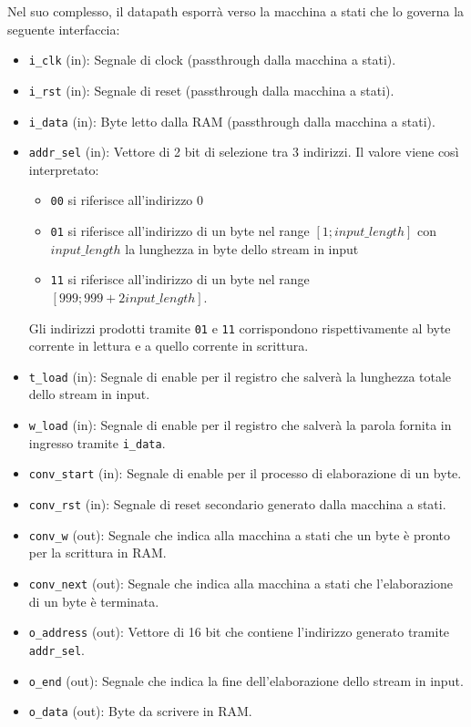 \documentclass[a4paper,11pt]{article}
\begin{document}
Nel suo complesso, il datapath esporrà verso la macchina a stati che lo governa
la seguente interfaccia:

\begin{itemize}
  \item \texttt{i\_clk} (in): Segnale di clock (passthrough dalla macchina a
    stati).
  \item \texttt{i\_rst} (in): Segnale di reset (passthrough dalla macchina a
    stati).
  \item \texttt{i\_data} (in): Byte letto dalla RAM (passthrough dalla macchina a
    stati).
  \item \texttt{addr\_sel} (in): Vettore di 2 bit di selezione tra 3 indirizzi. Il
    valore viene così interpretato:
    \begin{itemize}
      \item \texttt{00} si riferisce all'indirizzo 0
      \item \texttt{01} si riferisce all'indirizzo di un byte nel range $[1;
        \mathit{input\_length}]$ con $\mathit{input\_length}$ la lunghezza in
        byte dello stream in input
      \item \texttt{11} si riferisce all'indirizzo di un byte nel range $[999;
        999 + 2\mathit{input\_length}]$.
    \end{itemize}

    Gli indirizzi prodotti tramite \texttt{01} e \texttt{11} corrispondono
    rispettivamente al byte corrente in lettura e a quello corrente in
    scrittura.
  \item \texttt{t\_load} (in): Segnale di enable per il registro che salverà la
    lunghezza totale dello stream in input.
  \item \texttt{w\_load} (in): Segnale di enable per il registro che salverà la
    parola fornita in ingresso tramite \texttt{i\_data}.
  \item \texttt{conv\_start} (in): Segnale di enable per il processo di
    elaborazione di un byte.
  \item \texttt{conv\_rst} (in): Segnale di reset secondario generato dalla
    macchina a stati.
  \item \texttt{conv\_w} (out): Segnale che indica alla macchina a stati che un
    byte è pronto per la scrittura in RAM.
  \item \texttt{conv\_next} (out): Segnale che indica alla macchina a stati che
    l'elaborazione di un byte è terminata.
  \item \texttt{o\_address} (out): Vettore di 16 bit che contiene l'indirizzo
    generato tramite \texttt{addr\_sel}.
  \item \texttt{o\_end} (out): Segnale che indica la fine dell'elaborazione
    dello stream in input.
  \item \texttt{o\_data} (out): Byte da scrivere in RAM.
\end{itemize}
\end{document}

